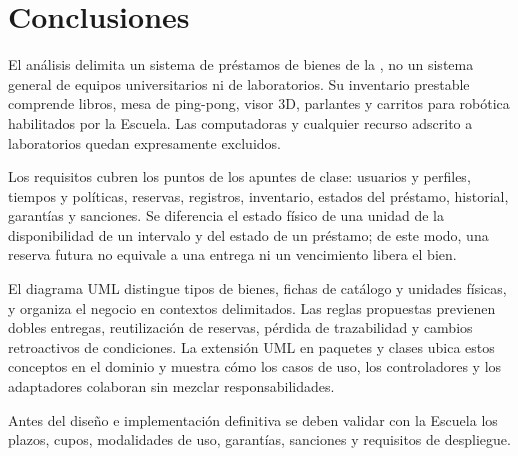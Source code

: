 \chapter{Conclusiones}

El an\'alisis delimita un sistema de pr\'estamos de bienes de la \escuela{}, no un sistema general de equipos universitarios ni de laboratorios. Su inventario prestable comprende libros, mesa de ping-pong, visor 3D, parlantes y carritos para rob\'otica habilitados por la Escuela. Las computadoras y cualquier recurso adscrito a laboratorios quedan expresamente excluidos.

Los requisitos cubren los puntos de los apuntes de clase: usuarios y perfiles, tiempos y pol\'iticas, reservas, registros, inventario, estados del pr\'estamo, historial, garant\'ias y sanciones. Se diferencia el estado f\'isico de una unidad de la disponibilidad de un intervalo y del estado de un pr\'estamo; de este modo, una reserva futura no equivale a una entrega ni un vencimiento libera el bien.

El diagrama UML distingue tipos de bienes, fichas de cat\'alogo y unidades f\'isicas, y organiza el negocio en contextos delimitados. Las reglas propuestas previenen dobles entregas, reutilizaci\'on de reservas, p\'erdida de trazabilidad y cambios retroactivos de condiciones. La extensi\'on UML en paquetes y clases ubica estos conceptos en el dominio y muestra c\'omo los casos de uso, los controladores y los adaptadores colaboran sin mezclar responsabilidades.

Antes del dise\~no e implementaci\'on definitiva se deben validar con la Escuela los plazos, cupos, modalidades de uso, garant\'ias, sanciones y requisitos de despliegue.
